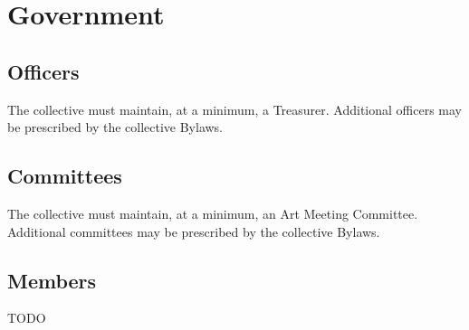 \chapter{Government}

\section{Officers}\label{sec:officers}
The collective must maintain, at a minimum, a Treasurer. Additional officers may be prescribed by the collective Bylaws.

\section{Committees}\label{sec:committees}
The collective must maintain, at a minimum, an Art Meeting Committee. Additional committees may be prescribed by the collective Bylaws.

\section{Members}\label{sec:members}
TODO
